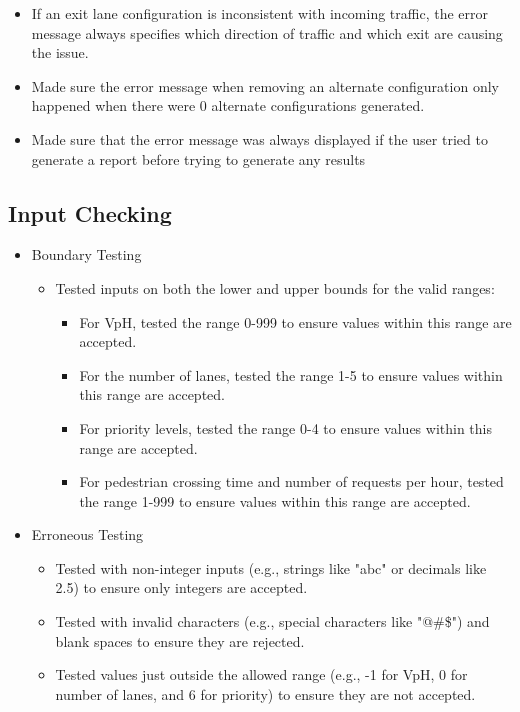 \documentclass{article}
\begin{document}
\begin{itemize}
\begin{itemize}
                \begin{itemize}
                    \item If an exit lane configuration is inconsistent with incoming traffic, the error message always specifies which direction of traffic and which exit are causing the issue.
                    \item Made sure the error message when removing an alternate configuration only happened when there were 0 alternate configurations generated.
                    \item Made sure that the error message was always displayed if the user tried to generate a report before trying to generate any results
                \end{itemize}
            \end{itemize}
        \end{itemize}

    \subsection{Input Checking}

        \begin{itemize}
            \item Boundary Testing
            \begin{itemize}
                \item Tested inputs on both the lower and upper bounds for the valid ranges:
                \begin{itemize}
                    \item For VpH, tested the range 0-999 to ensure values within this range are accepted.
                    \item For the number of lanes, tested the range 1-5 to ensure values within this range are accepted.
                    \item For priority levels, tested the range 0-4 to ensure values within this range are accepted.
                    \item For pedestrian crossing time and number of requests per hour, tested the range 1-999 to ensure values within this range are accepted.
                \end{itemize}
            \end{itemize}
            \item Erroneous Testing
            \begin{itemize}
                \item Tested with non-integer inputs (e.g., strings like "abc" or decimals like 2.5) to ensure only integers are accepted.
                \item Tested with invalid characters (e.g., special characters like "@\#\$") and blank spaces to ensure they are rejected.
                \item Tested values just outside the allowed range (e.g., -1 for VpH, 0 for number of lanes, and 6 for priority) to ensure they are not accepted.
            \end{itemize}
        \end{itemize}    
\end{document}
